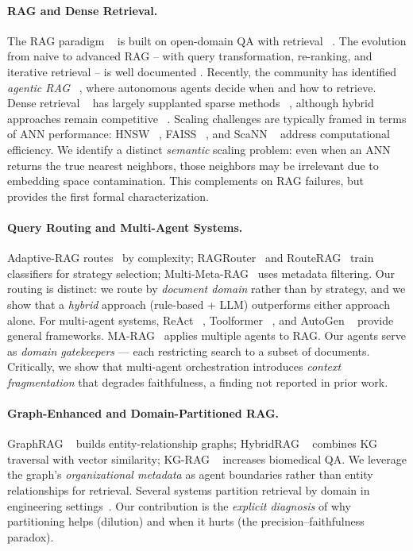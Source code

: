 \documentclass{article}
\begin{document}
\paragraph{RAG and Dense Retrieval.}
The RAG paradigm ~\citep{lewis2020rag} is built on open-domain QA with retrieval ~\citep{chen2017drqa, karpukhin2020dpr}. The evolution from naive to advanced RAG -- with query transformation, re-ranking, and iterative retrieval -- is well documented \citep{gao2024ragsurvey, zhao2024ragsurvey2}. Recently, the community has identified \textit{agentic RAG} ~\citep{singh2025agenticrag}, where autonomous agents decide when and how to retrieve. Dense retrieval ~\citep{karpukhin2020dpr, xiong2021ance} has largely supplanted sparse methods ~\citep{robertson2009bm25}, although hybrid approaches remain competitive ~\citep{sawarkar2024blended}. Scaling challenges are typically framed in terms of ANN performance: HNSW ~\citep{malkov2020hnsw}, FAISS ~\citep{johnson2021faiss}, and ScaNN ~\citep{guo2020scann} address computational efficiency. We identify a distinct \textit{semantic} scaling problem: even when an ANN returns the true nearest neighbors, those neighbors may be irrelevant due to embedding space contamination. This complements \citet{barnett2024seven} on RAG failures, but provides the first formal characterization.

\paragraph{Query Routing and Multi-Agent Systems.}
Adaptive-RAG routes~\citep{jeong2024adaptiverag} by complexity; RAGRouter~\citep{zhang2025ragrouter} and RouteRAG~\citep{guo2025routerag} train classifiers for strategy selection; Multi-Meta-RAG~\citep{poliakov2024multimetarag} uses metadata filtering. Our routing is distinct: we route by \textit{document domain} rather than by strategy, and we show that a \textit{hybrid} approach (rule-based + LLM) outperforms either approach alone. For multi-agent systems, ReAct ~\citep{yao2023react}, Toolformer ~\citep{schick2023toolformer}, and AutoGen ~\citep{wu2023autogen} provide general frameworks. MA-RAG~\citep{nguyen2025marag} applies multiple agents to RAG. Our agents serve as \textit{domain gatekeepers} — each restricting search to a subset of documents. Critically, we show that multi-agent orchestration introduces \textit{context fragmentation} that degrades faithfulness, a finding not reported in prior work.

\paragraph{Graph-Enhanced and Domain-Partitioned RAG.}
GraphRAG ~\citep{edge2024local} builds entity-relationship graphs; HybridRAG ~\citep{sarmah2024hybridrag} combines KG traversal with vector similarity; KG-RAG ~\citep{sanmartin2024kgrag} increases biomedical QA. We leverage the graph's \textit{organizational metadata} as agent boundaries rather than entity relationships for retrieval. Several systems partition retrieval by domain in engineering settings~\citep {masoudifard2024leveraging}. Our contribution is the \textit{explicit diagnosis} of why partitioning helps (dilution) and when it hurts (the precision--faithfulness paradox).
\end{document}
